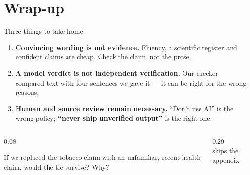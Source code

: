 \section[Wrap-up]{Wrap-up}

\begin{frame}{Three things to take home}
  \begin{takeaway}[Takeaways]
    \begin{enumerate}\setlength{\itemsep}{2pt}
      \item \textbf{Convincing wording is not evidence.} Fluency, a scientific register and confident claims are cheap. Check the claim, not the prose.
      \item \textbf{A model verdict is not independent verification.} Our checker compared text with four sentences we gave it --- it can be right for the wrong reasons.
      \item \textbf{Human and source review remain necessary.} ``Don't use AI'' is the wrong policy; \textbf{``never ship unverified output''} is the right one.
    \end{enumerate}
  \end{takeaway}
  \vspace{2mm}
  \begin{columns}[T,onlytextwidth]
    \begin{column}{0.68\textwidth}
      \begin{exercise}
        If we replaced the tobacco claim with an unfamiliar, recent health claim, would the tie survive? Why?
      \end{exercise}
    \end{column}
    \begin{column}{0.29\textwidth}\centering
      \vspace{2mm}
      \hyperlink{frm:resources}{}\\[1mm]
      {\tiny\color{gray}skips the appendix}
    \end{column}
  \end{columns}
\end{frame}

